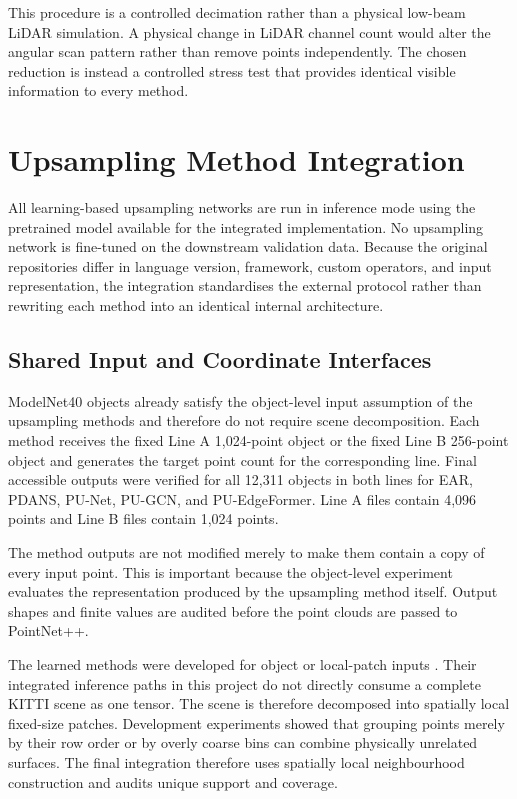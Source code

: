 This procedure is a controlled decimation rather than a physical low-beam LiDAR simulation. A physical change in LiDAR channel count would alter the angular scan pattern rather than remove points independently. The chosen reduction is instead a controlled stress test that provides identical visible information to every method.

\section{Upsampling Method Integration}
\label{sec:fc-4-5}

All learning-based upsampling networks are run in inference mode using the pretrained model available for the integrated implementation. No upsampling network is fine-tuned on the downstream validation data. Because the original repositories differ in language version, framework, custom operators, and input representation, the integration standardises the external protocol rather than rewriting each method into an identical internal architecture.

\subsection{Shared Input and Coordinate Interfaces}
\label{sec:fc-4-5-1}

ModelNet40 objects already satisfy the object-level input assumption of the upsampling methods and therefore do not require scene decomposition. Each method receives the fixed Line A 1,024-point object or the fixed Line B 256-point object and generates the target point count for the corresponding line. Final accessible outputs were verified for all 12,311 objects in both lines for EAR, PDANS, PU-Net, PU-GCN, and PU-EdgeFormer. Line A files contain 4,096 points and Line B files contain 1,024 points.

The method outputs are not modified merely to make them contain a copy of every input point. This is important because the object-level experiment evaluates the representation produced by the upsampling method itself. Output shapes and finite values are audited before the point clouds are passed to PointNet++.

\label{sec:fc-4-5-2}

The learned methods were developed for object or local-patch inputs \cite{yu2018punet,qian2021pugcn,kim2023puedgeformer,zhang2025pdans}. Their integrated inference paths in this project do not directly consume a complete KITTI scene as one tensor. The scene is therefore decomposed into spatially local fixed-size patches. Development experiments showed that grouping points merely by their row order or by overly coarse bins can combine physically unrelated surfaces. The final integration therefore uses spatially local neighbourhood construction and audits unique support and coverage.

